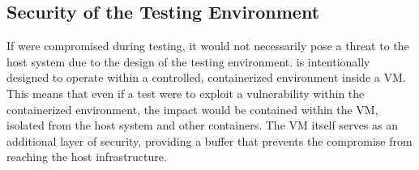 \subsection{Security of the Testing Environment}

If \houdini were compromised during testing, it would not necessarily pose a threat to the host system due to the design of the testing environment. \houdini is intentionally designed to operate within a controlled, containerized environment inside a VM. This means that even if a test were to exploit a vulnerability within the containerized environment, the impact would be contained within the VM, isolated from the host system and other containers. The VM itself serves as an additional layer of security, providing a buffer that prevents the compromise from reaching the host infrastructure.